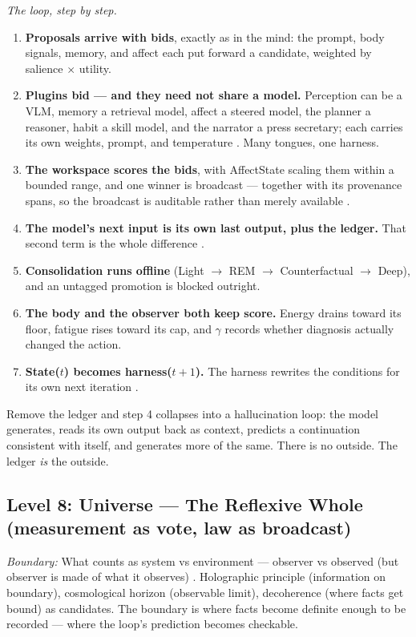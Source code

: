 \documentclass[11pt]{article}
\begin{document}
{\textit{The loop, step by step.}
\begin{enumerate}\itemsep2pt
\item \textbf{Proposals arrive with bids}, exactly as in the mind: the
prompt, body signals, memory, and affect each put forward a candidate,
weighted by salience $\times$ utility.
\item \textbf{Plugins bid --- and they need not share a model.} Perception
can be a VLM, memory a retrieval model, affect a steered model, the
planner a reasoner, habit a skill model, and the narrator a press
secretary; each carries its own weights, prompt, and temperature
\citep{lin2026ahe}. Many tongues, one harness.
\item \textbf{The workspace scores the bids}, with AffectState scaling
them within a bounded range, and one winner is broadcast --- together with
its provenance spans, so the broadcast is auditable rather than merely
available \citep{baars1997,atallah2026gwt}.
\item \textbf{The model's next input is its own last output, plus the
ledger.} That second term is the whole difference
\citep{lindsey2025,macar2026}.
\item \textbf{Consolidation runs offline} (Light $\to$ REM $\to$
Counterfactual $\to$ Deep), and an untagged promotion is blocked outright.
\item \textbf{The body and the observer both keep score.} Energy drains
toward its floor, fatigue rises toward its cap, and $\gamma$ records
whether diagnosis actually changed the action.
\item \textbf{State($t$) becomes harness($t{+}1$).} The harness rewrites
the conditions for its own next iteration \citep{maturana1980}.
\end{enumerate}

Remove the ledger and step 4 collapses into a hallucination loop: the
model generates, reads its own output back as context, predicts a
continuation consistent with itself, and generates more of the same. There
is no outside. The ledger \emph{is} the outside.

\subsection{Level 8: Universe --- The Reflexive Whole (measurement as vote, law as broadcast)}

\textit{Boundary:} What counts as system vs environment --- observer vs observed (but observer is made of what it observes) \citep{maturana1980}. Holographic principle (information on boundary), cosmological horizon (observable limit), decoherence (where facts get bound) as candidates. The boundary is where facts become definite enough to be recorded --- where the loop's prediction becomes checkable.

}
\end{document}
